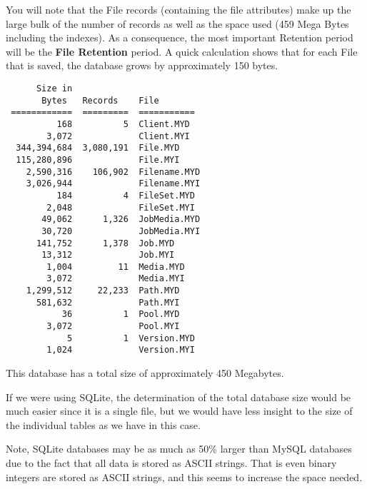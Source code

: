 You will note that the File records (containing the file attributes) make up
the large bulk of the number of records as well as the space used (459 Mega
Bytes including the indexes). As a consequence, the most important Retention
period will be the {\bf File Retention} period. A quick calculation shows that
for each File that is saved, the database grows by approximately 150 bytes.

\footnotesize
\begin{verbatim}
      Size in
       Bytes   Records    File
 ============  =========  ===========
          168          5  Client.MYD
        3,072             Client.MYI
  344,394,684  3,080,191  File.MYD
  115,280,896             File.MYI
    2,590,316    106,902  Filename.MYD
    3,026,944             Filename.MYI
          184          4  FileSet.MYD
        2,048             FileSet.MYI
       49,062      1,326  JobMedia.MYD
       30,720             JobMedia.MYI
      141,752      1,378  Job.MYD
       13,312             Job.MYI
        1,004         11  Media.MYD
        3,072             Media.MYI
    1,299,512     22,233  Path.MYD
      581,632             Path.MYI
           36          1  Pool.MYD
        3,072             Pool.MYI
            5          1  Version.MYD
        1,024             Version.MYI
\end{verbatim}
\normalsize

This database has a total size of approximately 450 Megabytes.

If we were using SQLite, the determination of the total database size would be
much easier since it is a single file, but we would have less insight to the
size of the individual tables as we have in this case.

Note, SQLite databases may be as much as 50\% larger than MySQL databases due
to the fact that all data is stored as ASCII strings. That is even binary
integers are stored as ASCII strings, and this seems to increase the space
needed.
